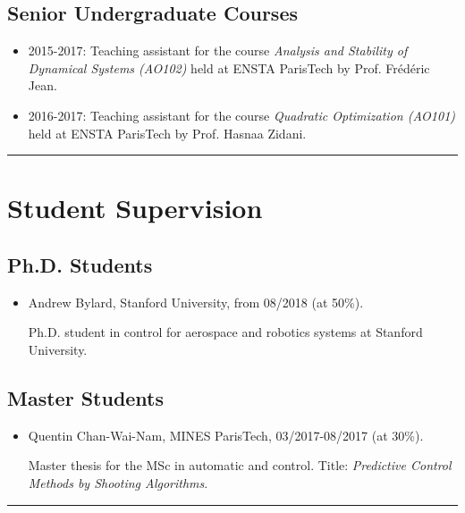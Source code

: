\documentclass[a4paper,12pt]{article}
\begin{document}
\subsection{Senior Undergraduate Courses}

\begin{itemize}
\item 2015-2017: Teaching assistant for the course \textit{Analysis and Stability of Dynamical Systems (AO102)} held at ENSTA ParisTech by Prof. Fr\'{e}d\'{e}ric Jean.
\item 2016-2017: Teaching assistant for the course \textit{Quadratic Optimization (AO101)} held at ENSTA ParisTech by Prof. Hasnaa Zidani.
\end{itemize}

\begingroup
\begin{center}
\noindent\rule{7cm}{0.4pt}
\end{center}
\endgroup

\section{Student Supervision}

\subsection{Ph.D. Students}

\begin{itemize}
\item Andrew Bylard, Stanford University, from 08/2018 (at 50\%).

Ph.D. student in control for aerospace and robotics systems at Stanford University. 
\end{itemize}

\subsection{Master Students}

\begin{itemize}
\item Quentin Chan-Wai-Nam, MINES ParisTech, 03/2017-08/2017 (at 30\%).

Master thesis for the MSc in automatic and control. Title: \textit{Predictive Control Methods by Shooting Algorithms}.
\end{itemize}

\begingroup
\begin{center}
\noindent\rule{7cm}{0.4pt}
\end{center}
\endgroup
\end{document}
